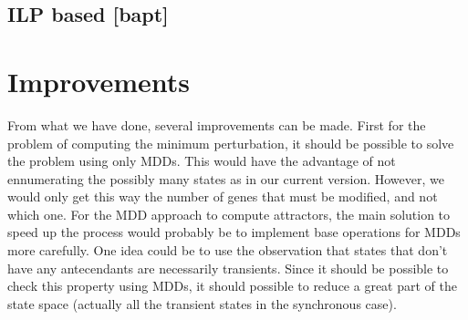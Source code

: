 \documentclass[a4paper,11pt]{article}
\begin{document}
\subsection*{ILP based [bapt]} %


\section{Improvements}

From what we have done, several improvements can be made. First for the problem of computing the minimum perturbation, it should be possible to solve the problem using only MDDs. This would have the advantage of not ennumerating the possibly many states as in our current version. However, we would only get this way the number of genes that must be modified, and not which one. 
For the MDD approach to compute attractors, the main solution to speed up the process would probably be to implement base operations for MDDs more carefully. 
One idea could be to use the observation that states that don't have any antecendants are necessarily transients. Since it should be possible to check this property using MDDs, it should possible to reduce a great part of the state space (actually all the transient states in the synchronous case).




\end{document}
